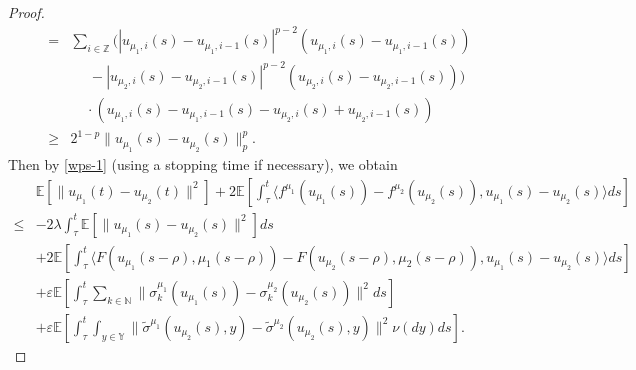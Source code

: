 \documentclass[11pt]{article}
\numberwithin{equation}{section}
\theoremstyle{plain}
\begin{document}
\begin{proof}
\begin{align*}
   = & \sum_{i \in \mathbb{Z} }
            \Big( |u_{\mu_1,i}(s) - u_{\mu_1,i-1}(s)|^{p-2} \left( u_{\mu_1,i}(s) - u_{\mu_1,i-1}(s) \right)
                        \nonumber \\
       & \ \ \ \ \ \
                  - |u_{\mu_2,i}(s) - u_{\mu_2,i-1}(s)|^{p-2} \left( u_{\mu_2,i} (s) - u_{\mu_2,i-1}(s) \right)
            \Big)       \nonumber \\
       & \ \ \ \ \
            \cdot
            \left( u_{\mu_1,i}(s) - u_{\mu_1,i-1}(s) - u_{\mu_2,i}(s) + u_{\mu_2,i-1}(s) \right)  \nonumber \\
  \ge & 2^{1-p} \| u_{\mu_1}(s) - u_{\mu_2}(s) \|_p^p.
 \end{align*}
Then by \eqref{wps-1}
(using a stopping time
if necessary),   we obtain
 \begin{align}\label{wps-2}
        & \mathbb{E}
             \left[ \|u_{\mu_1}(t) - u_{\mu_2}(t) \|^2 \right]
          + 2 \mathbb{E}
                 \left[ \int_{\tau}^{t}
                           \langle f^{\mu_1} (u_{\mu_1}(s)) - f^{\mu_2} (u_{\mu_2}(s)),
                                   u_{\mu_1}(s) - u_{\mu_2}(s)
                           \rangle ds
                 \right]  \nonumber \\
  \le & - 2 \lambda \int_{\tau}^{t}
             \mathbb{E}
                \left[ \| u_{\mu_1}(s) - u_{\mu_2}(s) \|^2 \right] ds  \nonumber \\
       & + 2 \mathbb{E}
                \left[ \int_{\tau}^{t}
                          \langle F( u_{\mu_1}(s-\rho),  {\mu_1}(s-\rho) ) - F( u_{\mu_2}(s-\rho),  {\mu_2}(s-\rho) ),
                                  u_{\mu_1}(s) - u_{\mu_2}(s)
                          \rangle ds
                \right]  \nonumber\\
       & + \varepsilon \mathbb{E}
              \left[ \int_{\tau}^{t}
                        \sum_{k \in \mathbb{N}}
                           \| \sigma^{\mu_1}_k(u_{\mu_1}(s)) - \sigma^{\mu_2}_k(u_{\mu_2}(s)) \|^2 ds
              \right]  \nonumber \\
       & + \varepsilon \mathbb{E}
              \left[
                     \int_{\tau}^{t}  
                        \int_{
                        y\in \mathbb{Y}
                        } \| \widetilde{\sigma}^{\mu_1}(u_{\mu_2}(s),y) - \widetilde{\sigma}^{\mu_2}(u_{\mu_2}(s),y) \|^2
                        \nu (dy)
                     ds
              \right].
 \end{align}


\end{proof}
\end{document}
